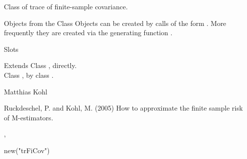 \begin{Description}\relax
Class of trace of finite-sample covariance.
\end{Description}
\begin{Section}{Objects from the Class}
Objects can be created by calls of the form .
More frequently they are created via the generating function 
.
\end{Section}
\begin{Section}{Slots}
\end{Section}
\begin{Section}{Extends}
Class , directly.\\
Class , by class .
\end{Section}
\begin{Author}\relax
Matthias Kohl 
\end{Author}
\begin{References}\relax
Ruckdeschel, P. and Kohl, M. (2005) How to approximate 
the finite sample risk of M-estimators.
\end{References}
\begin{SeeAlso}\relax
{}, 
\end{SeeAlso}
\begin{Examples}
\begin{ExampleCode}
new("trFiCov")
\end{ExampleCode}
\end{Examples}

